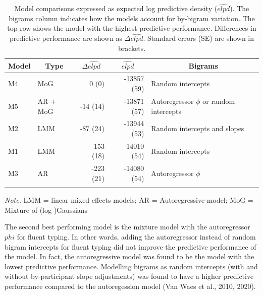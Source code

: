 \documentclass[english,jou,floatsintext]{apa7}
\begin{document}
\begin{table}[!ht]

\begin{center}
\begin{threeparttable}

\caption{\label{tab:modelcomparisons}Model comparisons expressed as expected log predictive density ($\widehat{elpd}$). The bigrams column indicates how the models account for by-bigram variation. The top row shows the model with the highest predictive performance. Differences in predictive performance are shown as $\Delta\widehat{elpd}$. Standard errors (SE) are shown in brackets.}

\begin{tabular}{llrrl}
\toprule
Model & \multicolumn{1}{c}{Type} & \multicolumn{1}{c}{$\Delta\widehat{elpd}$} & \multicolumn{1}{c}{$\widehat{elpd}$} & \multicolumn{1}{c}{Bigrams}\\
\midrule
M4 & MoG & 0 (0) & -13857 (59) & Random intercepts\\
M5 & AR + MoG & -14 (14) & -13871 (57) & Autoregressor $\phi$ or random intercepts\\
M2 & LMM & -87 (24) & -13944 (53) & Random intercepts and slopes\\
M1 & LMM & -153 (18) & -14010 (54) & Random intercepts\\
M3 & AR & -223 (21) & -14080 (54) & Autoregressor $\phi$\\
\bottomrule
\addlinespace
\end{tabular}

\begin{tablenotes}[para]
\normalsize{\textit{Note.} LMM = linear mixed effects models; AR = Autoregressive model; MoG = Mixture of (log-)Gaussians}
\end{tablenotes}

\end{threeparttable}
\end{center}

\end{table}

The second best performing model is the mixture model with the autoregressor \(phi\) for fluent typing. In other words, adding the autoregressor instead of random bigram intercepts for fluent typing did not improve the predictive performance of the model. In fact, the autoregressive model was found to be the model with the lowest predictive performance. Modelling bigrams as random intercepts (with and without by-participant slope adjustments) was found to have a higher predictive performance compared to the autoregession model (Van Waes et al., 2010, 2020).
\end{document}
